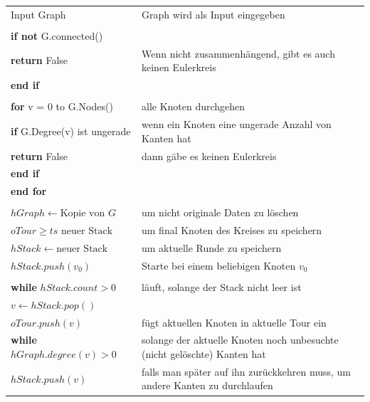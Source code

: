 \documentclass{article}
\begin{document}
\begin{algorithm}[H]
\caption{Hierholzer-Algorithmus für einen Eulerkreis}\label{alg:hierholzer}
\begin{table}[H] 
    \centering
    \begin{tabular}{p{6cm} p{9cm}}
        Input Graph & Graph wird als Input eingegeben\\
        & \\
        \textbf{if not} {G.connected()}  &  \\
        \setlength\parindent{12pt} \textbf{return} False & Wenn nicht zusammenhängend, gibt es auch keinen Eulerkreis  \\
        \textbf{end if} & \\
        & \\
        \textbf{for} v = 0 to G.Nodes() & alle Knoten durchgehen \\
        \setlength\parindent{12pt} \textbf{if} G.Degree(v) ist ungerade & wenn ein Knoten eine ungerade Anzahl von Kanten hat \\
        \setlength\parindent{24pt} \textbf{return} False & dann gäbe es keinen Eulerkreis \\
        \setlength\parindent{12pt} \textbf{end if} & \\
        \textbf{end for} & \\
        & \\
        $hGraph \gets \text{Kopie von } G$ & um nicht originale Daten zu löschen \\
        $oTour \ge   ts \text{ neuer Stack}$ & um final Knoten des Kreises zu speichern \\
        $hStack \gets \text{neuer Stack}$  & um aktuelle Runde zu speichern \\
        $hStack.push(v_0)$ & Starte bei einem beliebigen Knoten $v_0$ \\
        & \\
        \textbf{while} $hStack.count > 0$ & läuft, solange der Stack nicht leer ist  \\
        \setlength\parindent{12pt} $v \gets hStack.pop()$ & \\
        \setlength\parindent{12pt}   $oTour.push(v)$ & fügt aktuellen Knoten in aktuelle Tour ein\\
         \setlength\parindent{12pt}  \textbf{while}  $hGraph.degree(v) > 0$ & solange der aktuelle Knoten noch unbesuchte (nicht gelöschte) Kanten hat\\
        \setlength\parindent{24pt}  $hStack.push(v)$ & falls man später auf ihn zurückkehren muss, um andere Kanten zu durchlaufen \\

\end{tabular}
\end{table}
\end{algorithm}
\end{document}
